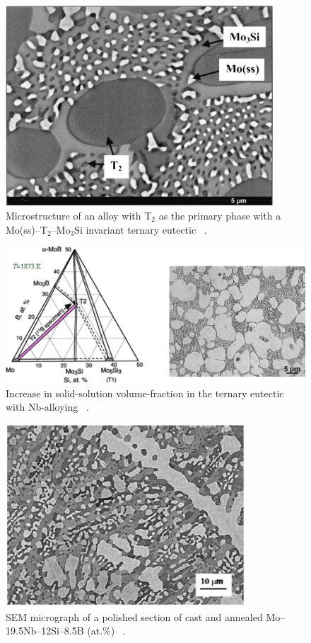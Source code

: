 \vspace{-5mm} 	
%
%
\begin{figure}[H]
\begin{center}
\includegraphics[width=10cm]{MoSiB_witheutectic}
\caption{Microstructure of an alloy with T$_2$ as the primary phase with a Mo(ss)--T$_2$--Mo$_3$Si invariant ternary eutectic ~\cite{perepezko01}.}
\label{fig:MoSiB_witheutectic}
\end{center}
\end{figure}
\vspace{.7cm} 
%
\begin{figure}[H]
\begin{center}
\includegraphics[width=\textwidth]{MoSiB_withNb}
\caption{Increase in solid-solution volume-fraction in the ternary eutectic with Nb-alloying ~\cite{perepezko01}.}\label{fig:MoSiB_withNb}
\end{center}
\end{figure}
%
\begin{figure}[H]
\begin{center}
\includegraphics[width=9cm]{Mo19Nb12Si8B}
\caption{SEM micrograph of a polished section of cast and annealed Mo--19.5Nb--12Si--8.5B (at.\%) ~\cite{perepezko01}.}\label{fig:Mo19Nb12Si8B}
\end{center}
\end{figure} 
%

